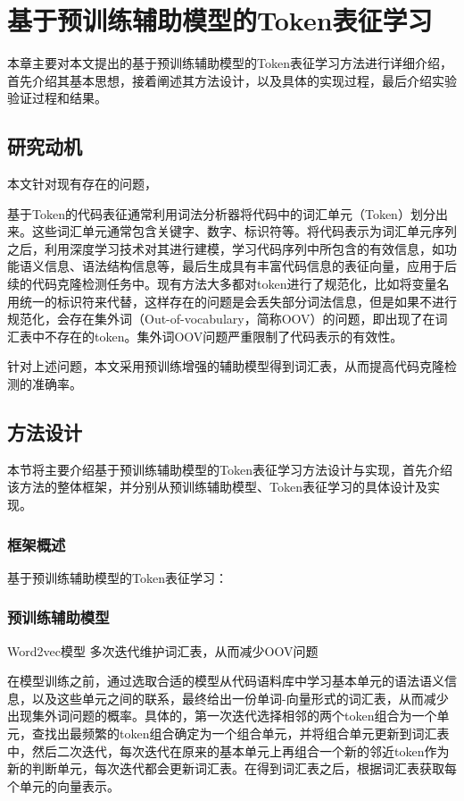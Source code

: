 \chapter{基于预训练辅助模型的Token表征学习}
本章主要对本文提出的基于预训练辅助模型的Token表征学习方法进行详细介绍，首先介绍其基本思想，接着阐述其方法设计，以及具体的实现过程，最后介绍实验验证过程和结果。
\section{研究动机}

本文针对现有存在的问题，

基于Token的代码表征通常利用词法分析器将代码中的词汇单元（Token）划分出来。这些词汇单元通常包含关键字、数字、标识符等。将代码表示为词汇单元序列之后，利用深度学习技术对其进行建模，学习代码序列中所包含的有效信息，如功能语义信息、语法结构信息等，最后生成具有丰富代码信息的表征向量，应用于后续的代码克隆检测任务中。现有方法大多都对token进行了规范化，比如将变量名用统一的标识符来代替，这样存在的问题是会丢失部分词法信息，但是如果不进行规范化，会存在集外词（Out-of-vocabulary，简称OOV）的问题，即出现了在词汇表中不存在的token。集外词OOV问题严重限制了代码表示的有效性。

针对上述问题，本文采用预训练增强的辅助模型得到词汇表，从而提高代码克隆检测的准确率。
\section{方法设计}

本节将主要介绍基于预训练辅助模型的Token表征学习方法设计与实现，首先介绍该方法的整体框架，并分别从预训练辅助模型、Token表征学习的具体设计及实现。

\subsection{框架概述}
基于预训练辅助模型的Token表征学习：

\subsection{预训练辅助模型}
Word2vec模型 多次迭代维护词汇表，从而减少OOV问题

在模型训练之前，通过选取合适的模型从代码语料库中学习基本单元的语法语义信息，以及这些单元之间的联系，最终给出一份单词-向量形式的词汇表，从而减少出现集外词问题的概率。具体的，第一次迭代选择相邻的两个token组合为一个单元，查找出最频繁的token组合确定为一个组合单元，并将组合单元更新到词汇表中，然后二次迭代，每次迭代在原来的基本单元上再组合一个新的邻近token作为新的判断单元，每次迭代都会更新词汇表。在得到词汇表之后，根据词汇表获取每个单元的向量表示。
